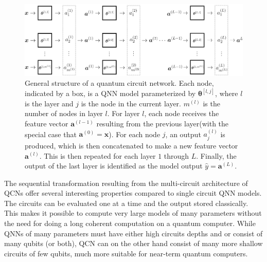 \begin{figure}[htp]
    \centering
    \includegraphics[width = 15cm]{latex/figures/QCN.png}
    \caption{General structure of a quantum circuit network. Each node, indicated by a box, is a QNN model parameterized by $\boldsymbol{\theta}^{[l,j]}$, where $l$ is the layer and $j$ is the node in the current layer. $m^{(l)}$ is the number of nodes in layer $l$. For layer $l$, each node receives the feature vector $\boldsymbol{a}^{(l-1)}$ resulting from the previous layer(with the special case that $\boldsymbol{a}^{(0)} = \boldsymbol{x}$). For each node $j$, an output $a^{(l)}_j$ is produced, which is then concatenated to make a new feature vector $\boldsymbol{a}^{(l)}$. This is then repeated for each layer $1$ through $L$. Finally, the output of the last layer is identified as the model output $\hat{y} = \boldsymbol{a}^{(L)}$.}
    \label{fig:QCN}
\end{figure}

The sequential transformation resulting from the multi-circuit architecture of QCNs offer several interesting properties compared to single circuit QNN models. The circuits can be evaluated one at a time and the output stored classically. This makes it possible to compute very large models of many parameters without the need for doing a long coherent computation on a quantum computer. While QNNs of many parameters must have either high circuits depths and or consist of many qubits (or both), QCN can on the other hand consist of many more shallow circuits of few qubits, much more suitable for near-term quantum computers. 

